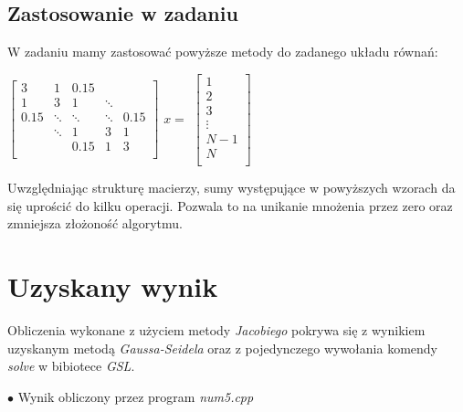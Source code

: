 \documentclass{article}
\begin{document}
  \subsection{Zastosowanie w zadaniu}
  W zadaniu mamy zastosować powyższe metody do zadanego układu równań:
  \begin{center}
  $\begin{bmatrix}
    3 & 1 & 0.15 &  &  \\
    1 & 3 & 1 & \ddots &  \\
    0.15 & \ddots & \ddots & \ddots & 0.15 \\
     & \ddots & 1 & 3 & 1 \\
     &  & 0.15 & 1 & 3 \\
  \end{bmatrix}$
  $x=$ 
  $\begin{bmatrix}
    1 \\
    2 \\
    3 \\
    \vdots \\
    N-1 \\
    N \\
  \end{bmatrix}$
  \end{center}
  Uwzględniając strukturę macierzy, sumy występujące w powyższych wzorach da się uprościć do kilku operacji. Pozwala to na unikanie mnożenia przez zero oraz zmniejsza złożoność algorytmu.
  
  \section{Uzyskany wynik}
  Obliczenia wykonane z użyciem metody \textit{Jacobiego} pokrywa się z wynikiem uzyskanym metodą \textit{Gaussa-Seidela} oraz z pojedynczego wywołania komendy \textit{solve} w bibiotece \textit{GSL}.
  \newpage
    \begin{flushleft}
      $\bullet$ Wynik obliczony przez program \textit{num5.cpp} \\
    \end{flushleft}
\end{document}
